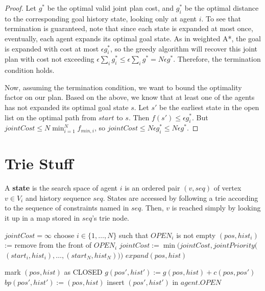 \documentclass[letterpaper]{article}
\begin{document}
\begin{proof}
Let $g^*$ be the optimal valid joint plan cost, and $g_i^*$ be the optimal distance to the corresponding goal history state, looking only at agent $i$. To see that termination is guaranteed, note that since each state is expanded at most once, eventually, each agent expands its optimal goal state. As in weighted A*, the goal is expanded with cost at most $\epsilon g_i^*$, so the greedy algorithm will recover this joint plan with cost not exceeding $\epsilon \sum_i g_i^* \le \epsilon \sum_i g^* = N\epsilon g^*$. Therefore, the termination condition holds.

Now, assuming the termination condition, we want to bound the optimality factor on our plan. Based on the above, we know that at least one of the agents has not expanded its optimal goal state $s$. Let $s'$ be the earliest state in the open list on the optimal path from $start$ to $s$. Then $f(s') \le \epsilon g_i^*$. But $jointCost \le N \min_{i=1}^N f_{min,i}$, so $jointCost \le N \epsilon g_i^* \le N\epsilon g^*$.
\end{proof}

\section{Trie Stuff}
A \textbf{state} is the search space of agent $i$ is an ordered pair $(v, seq)$ of vertex $v\in V_i$ and history sequence $seq$. States are accessed by following a trie according to the sequence of constraints named in $seq$. Then, $v$ is reached simply by looking it up in a map stored in $seq$'s trie node.

\begin{algorithm}
\caption{$search()$}
\label{alg:update}
\begin{algorithmic}
\STATE $jointCost = \infty$
\STATE choose $i\in\{1,\ldots,N\}$ such that $OPEN_{i}$ is not empty
\STATE $(pos, hist_i)$ := remove from the front of $OPEN_{i}$
\STATE $jointCost := \min(jointCost,jointPriority($\\\qquad$(start_i,hist_i),\ldots,(start_N,hist_N)))$
\ENDFOR
\ENDIF
\STATE $expand(pos, hist)$
\ENDWHILE
\end{algorithmic}
\end{algorithm}

\begin{algorithm}
\caption{$expand(pos, hist)$}
\label{alg:update}
\begin{algorithmic}
\STATE mark $(pos, hist)$ as CLOSED
\STATE $g(pos', hist') := g(pos, hist) + c(pos, pos')$
\STATE $bp(pos', hist') := (pos, hist)$
\STATE insert $(pos', hist')$ in $agent.OPEN$
\ENDIF
\ENDIF
\ENDFOR
\end{algorithmic}
\end{algorithm}
\end{document}
